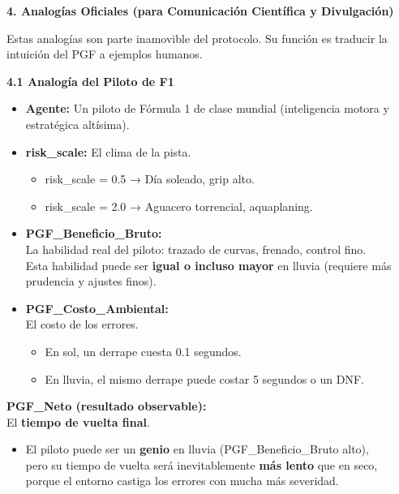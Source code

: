 \textbf{4. Analogías Oficiales (para Comunicación Científica y
Divulgación)}

Estas analogías son parte inamovible del protocolo. Su función es
traducir la intuición del PGF a ejemplos humanos.

\textbf{4.1 Analogía del Piloto de F1}

\begin{itemize}
\item
  \textbf{Agente:} Un piloto de Fórmula 1 de clase mundial (inteligencia
  motora y estratégica altísima).
\item
  \textbf{risk\_scale:} El clima de la pista.

  \begin{itemize}
  \item
    risk\_scale = 0.5 → Día soleado, grip alto.
  \item
    risk\_scale = 2.0 → Aguacero torrencial, aquaplaning.
  \end{itemize}
\item
  \textbf{PGF\_Beneficio\_Bruto:}\\
  La habilidad real del piloto: trazado de curvas, frenado, control
  fino.\\
  Esta habilidad puede ser \textbf{igual o incluso mayor} en lluvia
  (requiere más prudencia y ajustes finos).
\item
  \textbf{PGF\_Costo\_Ambiental:}\\
  El costo de los errores.

  \begin{itemize}
  \item
    En sol, un derrape cuesta 0.1 segundos.
  \item
    En lluvia, el mismo derrape puede costar 5 segundos o un DNF.
  \end{itemize}
\end{itemize}

\textbf{PGF\_Neto (resultado observable):}\\
El \textbf{tiempo de vuelta final}.

\begin{itemize}
\item
  El piloto puede ser un \textbf{genio} en lluvia (PGF\_Beneficio\_Bruto
  alto),\\
  pero su tiempo de vuelta será inevitablemente \textbf{más lento} que
  en seco,\\
  porque el entorno castiga los errores con mucha más severidad.
\end{itemize}

